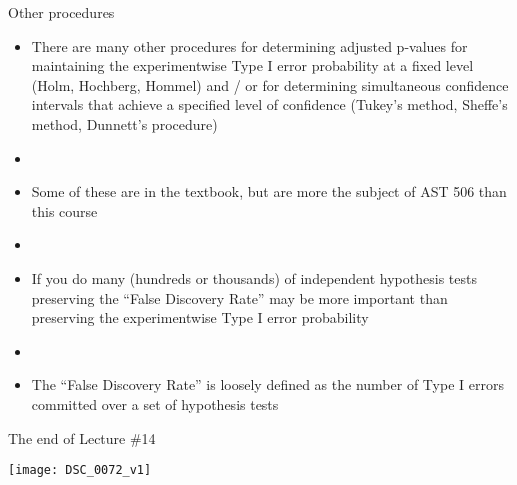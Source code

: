 \documentclass[xcolor=dvipsnames]{beamer}
\begin{document}
\begin{frame}{Other procedures}
	\begin{itemize}
		\item There are many other procedures for determining adjusted p-values for maintaining the experimentwise Type I error probability at a fixed level (Holm, Hochberg, Hommel) and / or for determining simultaneous confidence intervals that achieve a specified level of confidence (Tukey's method, Sheffe's method, Dunnett's procedure) \pause
		\item[]
		\item Some of these are in the textbook, but are more the subject of AST 506 than this course \pause
		\item[]
		\item If you do many (hundreds or thousands) of independent hypothesis tests preserving the ``False Discovery Rate'' may be more important than preserving the experimentwise Type I error probability \pause
		\item[]
		\item The ``False Discovery Rate'' is loosely defined as the number of Type I errors committed over a set of hypothesis tests
	\end{itemize}
\end{frame}

\begin{frame}{The end of Lecture \#14}
	\begin{center}
			\texttt{[image: DSC\_0072\_v1]}
	\end{center}
\end{frame}
\end{document}
